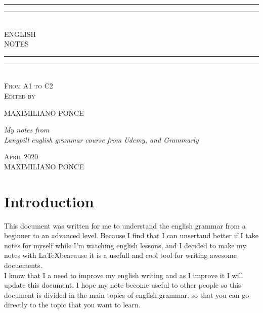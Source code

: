 \documentclass[10pt,a4paper]{article}
\newlength{\drop}
\begin{document}
\begin{titlepage}

\textheight
    \centering
    \vspace*{\baselineskip}
    \rule{\textwidth}{1.6pt}\vspace*{-\baselineskip}\vspace*{2pt}
    \rule{\textwidth}{0.6pt}\\[\baselineskip]
    {\LARGE ENGLISH\\[0.2\baselineskip] NOTES}\\[0.2\baselineskip]
    \rule{\textwidth}{0.4pt}\vspace*{-\baselineskip}\vspace{3.2pt}
    \rule{\textwidth}{1.6pt}\\[\baselineskip]
    \scshape
    From A1 to C2 \\
    \vspace*{2\baselineskip}
    Edited by \\[\baselineskip]
    {\Large MAXIMILIANO PONCE\par}
    {\itshape My notes from \\Langpill english grammar course from Udemy, and Grammarly\\\par}
    \vfill
    {\scshape April 2020} \\
    {\large MAXIMILIANO PONCE}\par

\end{titlepage}

\tableofcontents
\newpage

\section{Introduction}
\indent
This document was written for me to understand the english grammar from a beginner to an advanced level. Because I find that I can unsertand better if I take notes for myself while I'm watching english lessons, and I decided to make my notes with \LaTeX  beacause it is a usefull and cool tool for writing awesome docuements.\\

\indent I know that I a need to improve my english writing and as I improve it I will update this document. I hope my note become useful to other people so this document is divided in the main topics of english grammar, so that you can go directly to the topic that you want to learn.\\
\end{document}
